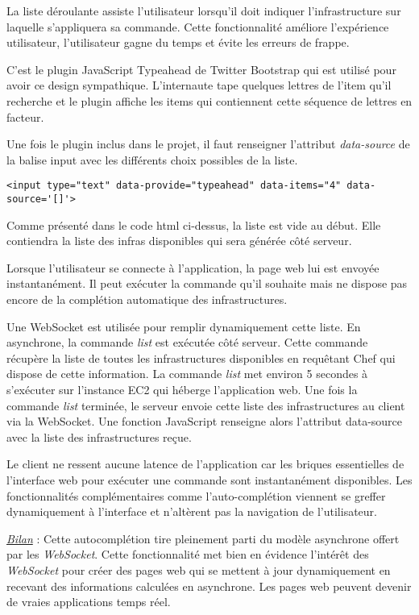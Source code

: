 La liste déroulante assiste l'utilisateur lorsqu'il doit indiquer
l'infrastructure sur laquelle s'appliquera sa commande.
Cette fonctionnalité améliore l'expérience utilisateur, l'utilisateur gagne du
temps et évite les erreurs de frappe.

C'est le plugin JavaScript Typeahead de Twitter Bootstrap qui est utilisé pour
avoir ce design sympathique. L'internaute tape quelques lettres de l'item qu'il
recherche et le plugin affiche les items qui contiennent cette séquence de
lettres en facteur.

Une fois le plugin inclus dans le projet, il faut renseigner l'attribut
\textit{data-source} de la balise input avec les différents choix possibles de
la liste.

\lstset{language=XML}
\begin{lstlisting}[caption=utilisation de bootstrap-typeahead]
  <input type="text" data-provide="typeahead" data-items="4" data-source='[]'>
\end{lstlisting}

Comme présenté dans le code html ci-dessus, la liste est vide au début.
Elle contiendra la liste des infras disponibles qui sera générée côté serveur.

Lorsque l'utilisateur se connecte à l'application, la page web lui est envoyée
instantanément. Il peut exécuter la commande qu'il souhaite mais ne
dispose pas encore de la complétion automatique des infrastructures.

Une WebSocket est utilisée pour remplir dynamiquement cette liste.
En asynchrone, la commande \textit{list} est exécutée côté serveur.
Cette commande récupère la liste de toutes les infrastructures disponibles en
requêtant Chef qui dispose de cette information. La commande \textit{list} met
environ 5 secondes à s'exécuter sur l'instance EC2 qui héberge l'application
web.
Une fois la commande \textit{list} terminée, le serveur envoie cette liste des
infrastructures au client via la WebSocket.
Une fonction JavaScript renseigne alors l'attribut data-source avec
la liste des infrastructures reçue.

Le client ne ressent aucune latence de l'application car les briques essentielles
de l'interface web pour exécuter une commande sont instantanément disponibles.
Les fonctionnalités complémentaires comme l'auto-complétion viennent se greffer
dynamiquement à l'interface et n'altèrent pas la navigation de l'utilisateur.

\underline{\textit{Bilan}} : Cette autocomplétion tire pleinement parti du
modèle asynchrone offert par les \textit{WebSocket}. Cette fonctionnalité met
bien en évidence l'intérêt des \textit{WebSocket} pour créer des pages web qui
se mettent à jour dynamiquement en recevant des informations calculées en
asynchrone. Les pages web peuvent devenir de vraies applications temps réel.

